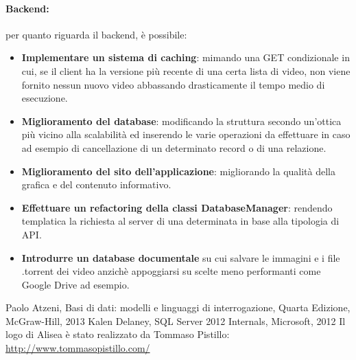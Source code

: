 \documentclass[a4]{book}
\begin{document}
\paragraph{Backend:}per quanto riguarda il backend, è possibile:
\begin{itemize}
	\item \textbf{Implementare un sistema di caching}: mimando una GET condizionale in cui, se il client ha la versione più recente di una certa lista di video, non viene fornito nessun nuovo video abbassando drasticamente il tempo medio di esecuzione.
	\item \textbf{Miglioramento del database}: modificando la struttura secondo un'ottica più vicino alla scalabilità ed inserendo le varie operazioni da effettuare in caso ad esempio di cancellazione di un determinato record o di una relazione.
	\item \textbf{Miglioramento del sito dell'applicazione}: migliorando la qualità della grafica e del contenuto informativo.
	\item \textbf{Effettuare un refactoring della classi DatabaseManager}: rendendo templatica la richiesta al server di una determinata in base alla tipologia di API.
	\item \textbf{Introdurre un database documentale} su cui salvare le immagini e i file .torrent dei video anzichè appoggiarsi su scelte meno performanti come Google Drive ad esempio.
\end{itemize}

\begin{thebibliography}{9}
	
	Paolo Atzeni, Basi di dati: modelli e linguaggi di interrogazione, Quarta Edizione, McGraw-Hill, 2013
	Kalen Delaney, SQL Server 2012 Internals, Microsoft, 2012
	Il logo di Alisea è stato realizzato da Tommaso Pistillo: \url{http://www.tommasopistillo.com/}
	
	\end{thebibliography}
	
\end{document}
